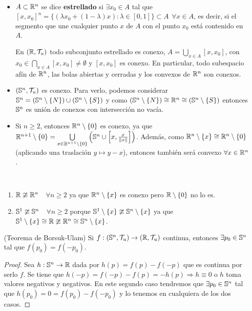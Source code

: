 \begin{ejemplo}\
    \begin{itemize}
        \item $A\subset \mathbb{R}^n$ se dice \textbf{estrellado} si $\exists x_0 \in A$ tal que $[x,x_0]^n = \{(\lambda x_0 + (1-\lambda)x):\lambda \in [0,1]\}\subset A\ \ \forall x \in A$, es decir, si el segmento que une cualquier punto $x$ de $A$ con el punto $x_0$ está contenido en $A$.
        
        En $(\mathbb{R}, \mathcal{T}_u)$ todo subconjunto estrellado es conexo, $A=\bigcup\limits_{x\in A}[x,x_0]$, con $x_0\in \bigcap\limits_{x\in A}[x,x_0]\neq \emptyset$ y $[x,x_0]$ es conexo. En particular, todo subespacio afín de $\mathbb{R}^n$, las bolas abiertas y cerradas y los convexos de $\mathbb{R}^n$ son conexos.

        \item $(\mathbb{S}^n, \mathcal{T}_u)$ es conexo. Para verlo, podemos considerar $\mathbb{S}^n=(\mathbb{S}^n\setminus \{N\})\cup (\mathbb{S}^n \setminus \{S\})$ y como $(\mathbb{S}^n\setminus \{N\}) \cong \mathbb{R}^n \cong(\mathbb{S}^n\setminus \{S\})$ entonces $\mathbb{S}^n$ es unión de conexos con intersección no vacía.
        
        \item Si $n\geq 2$, entonces $\mathbb{R}^n \setminus\{0\}$ es conexo, ya que $\mathbb{R}^{n+1} \setminus \{0\}=\bigcup\limits_{x\in \mathbb{R}^{n+1}\setminus \{0\}} \left(\mathbb{S}^n\cup \left[x, \frac{x}{\|x\|}\right] \right)$. Además, como $\mathbb{R}^n\setminus\{x\}\cong \mathbb{R}^n \setminus\{0\}$ (aplicando una traslación $y\mapsto y-x$), entonces también será convexo $\forall x \in \mathbb{R}^n$.
    \end{itemize}
    \endsquare
\end{ejemplo}

\begin{coro}\
    \begin{enumerate}
        \item[(i)] $\mathbb{R}\ncong \mathbb{R}^n$\ \ $\forall n\geq 2$ ya que $\mathbb{R}^n\setminus\{x\}$ es conexo pero $\mathbb{R}\setminus \{0\}$ no lo es.
        \item[(ii)] $\mathbb{S}^1 \ncong \mathbb{S}^n$\ \ $\forall n \geq 2$ porque $\mathbb{S}^1\setminus \{x\}\ncong \mathbb{S}^n\setminus \{x\}$ ya que $\mathbb{S}^1\setminus \{x\}\cong \mathbb{R} \ncong \mathbb{R}^n \cong \mathbb{S}^n \setminus \{x\}$. 
    \end{enumerate}
    \endsquare
\end{coro}

\begin{teo}
    (Teorema de Borsuk-Ulam) Si $f:(\mathbb{S}^n, \mathcal{T}_u)\to (\mathbb{R}, \mathcal{T}_u)$ continua, entonces $\exists p_0\in \mathbb{S}^n$ tal que $f(p_0)=f(-p_0)$.
    \begin{proof}
        Sea $h:\mathbb{S}^n \to \mathbb{R}$ dada por $h(p)=f(p)-f(-p)$ que es continua por serlo $f$. Se tiene que $h(-p)=f(-p)-f(p)=-h(p) \Rightarrow h\equiv 0$ o $h$ toma valores negativos y negativos. En este segundo caso tendremos que $\exists p_0 \in \mathbb{S}^n$ tal que $h(p_0)=0=f(p_0)-f(-p_0)$ y lo tenemos en cualquiera de los dos casos.

    \end{proof} 
\end{teo}

